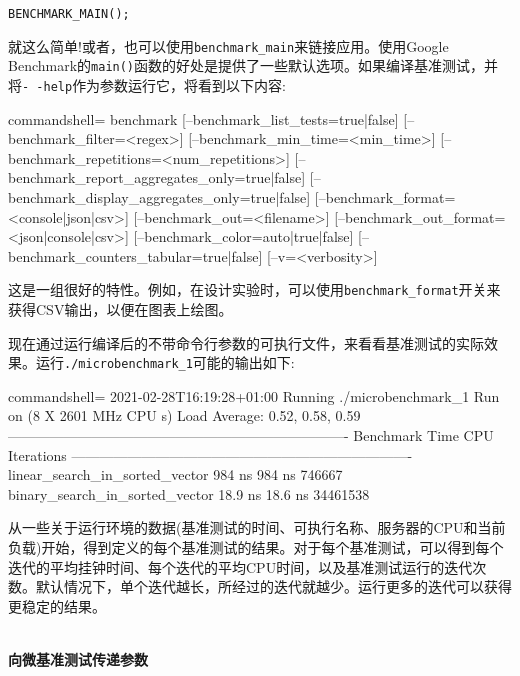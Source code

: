 \begin{lstlisting}[style=styleCXX]
BENCHMARK_MAIN();
\end{lstlisting}

就这么简单!或者，也可以使用\texttt{benchmark\_main}来链接应用。使用Google Benchmark的\texttt{main()}函数的好处是提供了一些默认选项。如果编译基准测试，并将\texttt{-\,-help}作为参数运行它，将看到以下内容:

\begin{tcblisting}{commandshell={}}
benchmark [--benchmark_list_tests={true|false}]
          [--benchmark_filter=<regex>]
          [--benchmark_min_time=<min_time>]
          [--benchmark_repetitions=<num_repetitions>]
          [--benchmark_report_aggregates_only={true|false}]
          [--benchmark_display_aggregates_only={true|false}]
          [--benchmark_format=<console|json|csv>]
          [--benchmark_out=<filename>]
          [--benchmark_out_format=<json|console|csv>]
          [--benchmark_color={auto|true|false}]
          [--benchmark_counters_tabular={true|false}]
          [--v=<verbosity>]
\end{tcblisting}

这是一组很好的特性。例如，在设计实验时，可以使用\texttt{benchmark\_format}开关来获得CSV输出，以便在图表上绘图。

现在通过运行编译后的不带命令行参数的可执行文件，来看看基准测试的实际效果。运行\texttt{./microbenchmark\_1}可能的输出如下:

\begin{tcblisting}{commandshell={}}
2021-02-28T16:19:28+01:00
Running ./microbenchmark_1
Run on (8 X 2601 MHz CPU s)
Load Average: 0.52, 0.58, 0.59
-------------------------------------------------------------------------
Benchmark Time CPU Iterations
-------------------------------------------------------------------------
linear_search_in_sorted_vector 984 ns 984 ns 746667
binary_search_in_sorted_vector 18.9 ns 18.6 ns 34461538
\end{tcblisting}

从一些关于运行环境的数据(基准测试的时间、可执行名称、服务器的CPU和当前负载)开始，得到定义的每个基准测试的结果。对于每个基准测试，可以得到每个迭代的平均挂钟时间、每个迭代的平均CPU时间，以及基准测试运行的迭代次数。默认情况下，单个迭代越长，所经过的迭代就越少。运行更多的迭代可以获得更稳定的结果。

\hspace*{\fill} \\ %
\noindent
\textbf{向微基准测试传递参数}

